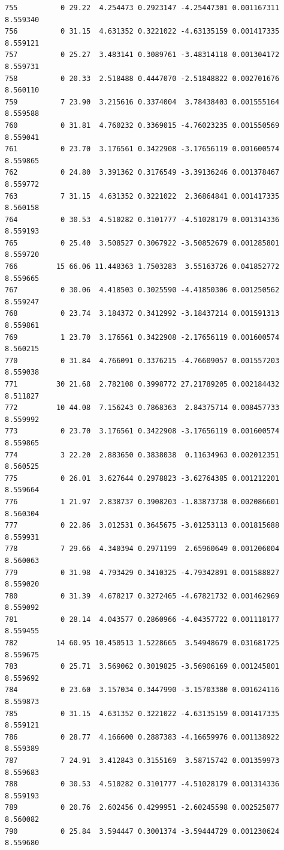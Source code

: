 \documentclass[]{book}
\theoremstyle{definition}
\theoremstyle{definition}
\theoremstyle{definition}
\theoremstyle{remark}
\begin{document}
\begin{verbatim}
755          0 29.22  4.254473 0.2923147 -4.25447301 0.001167311 8.559340
756          0 31.15  4.631352 0.3221022 -4.63135159 0.001417335 8.559121
757          0 25.27  3.483141 0.3089761 -3.48314118 0.001304172 8.559731
758          0 20.33  2.518488 0.4447070 -2.51848822 0.002701676 8.560110
759          7 23.90  3.215616 0.3374004  3.78438403 0.001555164 8.559588
760          0 31.81  4.760232 0.3369015 -4.76023235 0.001550569 8.559041
761          0 23.70  3.176561 0.3422908 -3.17656119 0.001600574 8.559865
762          0 24.80  3.391362 0.3176549 -3.39136246 0.001378467 8.559772
763          7 31.15  4.631352 0.3221022  2.36864841 0.001417335 8.560158
764          0 30.53  4.510282 0.3101777 -4.51028179 0.001314336 8.559193
765          0 25.40  3.508527 0.3067922 -3.50852679 0.001285801 8.559720
766         15 66.06 11.448363 1.7503283  3.55163726 0.041852772 8.559665
767          0 30.06  4.418503 0.3025590 -4.41850306 0.001250562 8.559247
768          0 23.74  3.184372 0.3412992 -3.18437214 0.001591313 8.559861
769          1 23.70  3.176561 0.3422908 -2.17656119 0.001600574 8.560215
770          0 31.84  4.766091 0.3376215 -4.76609057 0.001557203 8.559038
771         30 21.68  2.782108 0.3998772 27.21789205 0.002184432 8.511827
772         10 44.08  7.156243 0.7868363  2.84375714 0.008457733 8.559992
773          0 23.70  3.176561 0.3422908 -3.17656119 0.001600574 8.559865
774          3 22.20  2.883650 0.3838038  0.11634963 0.002012351 8.560525
775          0 26.01  3.627644 0.2978823 -3.62764385 0.001212201 8.559664
776          1 21.97  2.838737 0.3908203 -1.83873738 0.002086601 8.560304
777          0 22.86  3.012531 0.3645675 -3.01253113 0.001815688 8.559931
778          7 29.66  4.340394 0.2971199  2.65960649 0.001206004 8.560063
779          0 31.98  4.793429 0.3410325 -4.79342891 0.001588827 8.559020
780          0 31.39  4.678217 0.3272465 -4.67821732 0.001462969 8.559092
781          0 28.14  4.043577 0.2860966 -4.04357722 0.001118177 8.559455
782         14 60.95 10.450513 1.5228665  3.54948679 0.031681725 8.559675
783          0 25.71  3.569062 0.3019825 -3.56906169 0.001245801 8.559692
784          0 23.60  3.157034 0.3447990 -3.15703380 0.001624116 8.559873
785          0 31.15  4.631352 0.3221022 -4.63135159 0.001417335 8.559121
786          0 28.77  4.166600 0.2887383 -4.16659976 0.001138922 8.559389
787          7 24.91  3.412843 0.3155169  3.58715742 0.001359973 8.559683
788          0 30.53  4.510282 0.3101777 -4.51028179 0.001314336 8.559193
789          0 20.76  2.602456 0.4299951 -2.60245598 0.002525877 8.560082
790          0 25.84  3.594447 0.3001374 -3.59444729 0.001230624 8.559680

\end{verbatim}
\end{document}
